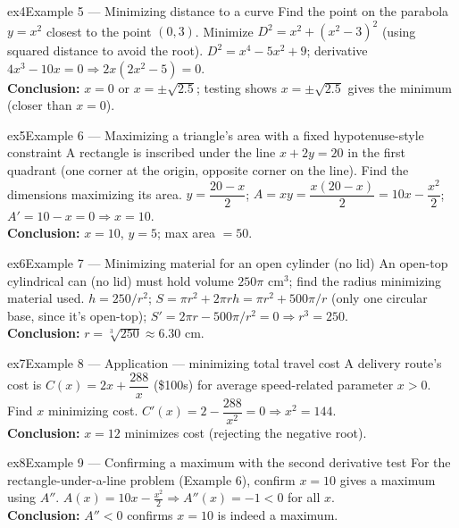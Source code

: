 \documentclass[11pt]{article}
\begin{document}
\begin{example}{ex4}{Example 5 --- Minimizing distance to a curve}
Find the point on the parabola $y=x^2$ closest to the point $(0,3)$.\soln
Minimize $D^2=x^2+(x^2-3)^2$ (using squared distance to avoid the root). $D^2=x^4-5x^2+9$; derivative $4x^3-10x=0\Rightarrow2x(2x^2-5)=0$.\\[3pt]\textbf{Conclusion:} $x=0$ or $x=\pm\sqrt{2.5}$; testing shows $x=\pm\sqrt{2.5}$ gives the minimum (closer than $x=0$).
\end{example}

\begin{example}{ex5}{Example 6 --- Maximizing a triangle's area with a fixed hypotenuse-style constraint}
A rectangle is inscribed under the line $x+2y=20$ in the first quadrant (one corner at the origin, opposite corner on the line). Find the dimensions maximizing its area.\soln
$y=\dfrac{20-x}2$; $A=xy=\dfrac{x(20-x)}2=10x-\dfrac{x^2}2$; $A'=10-x=0\Rightarrow x=10$.\\[3pt]\textbf{Conclusion:} $x=10$, $y=5$; max area $=50$.
\end{example}

\begin{example}{ex6}{Example 7 --- Minimizing material for an open cylinder (no lid)}
An open-top cylindrical can (no lid) must hold volume $250\pi$ cm$^3$; find the radius minimizing material used.\soln
$h=250/r^2$; $S=\pi r^2+2\pi rh=\pi r^2+500\pi/r$ (only one circular base, since it's open-top); $S'=2\pi r-500\pi/r^2=0\Rightarrow r^3=250$.\\[3pt]\textbf{Conclusion:} $r=\sqrt[3]{250}\approx6.30$ cm.
\end{example}

\begin{example}{ex7}{Example 8 --- Application --- minimizing total travel cost}
A delivery route's cost is $C(x)=2x+\dfrac{288}x$ (\$100s) for average speed-related parameter $x>0$. Find $x$ minimizing cost.\soln
$C'(x)=2-\dfrac{288}{x^2}=0\Rightarrow x^2=144$.\\[3pt]\textbf{Conclusion:} $x=12$ minimizes cost (rejecting the negative root).
\end{example}

\begin{example}{ex8}{Example 9 --- Confirming a maximum with the second derivative test}
For the rectangle-under-a-line problem (Example 6), confirm $x=10$ gives a maximum using $A''$.\soln
$A(x)=10x-\tfrac{x^2}2\Rightarrow A''(x)=-1<0$ for all $x$.\\[3pt]\textbf{Conclusion:} $A''<0$ confirms $x=10$ is indeed a maximum.
\end{example}
\end{document}
